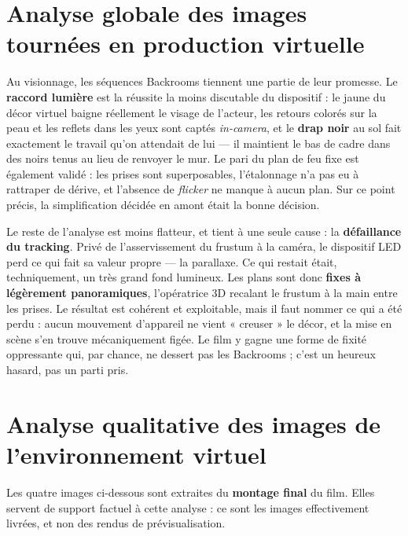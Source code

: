 \documentclass[11pt,a4paper]{report}
\begin{document}
\section{Analyse globale des images tournées en production virtuelle}
Au visionnage, les séquences Backrooms tiennent une partie de leur promesse. Le
\textbf{raccord lumière} est la réussite la moins discutable du dispositif : le jaune du décor
virtuel baigne réellement le visage de l'acteur, les retours colorés sur la peau et les reflets dans
les yeux sont captés \emph{in-camera}, et le \textbf{drap noir} au sol fait exactement le travail
qu'on attendait de lui --- il maintient le bas de cadre dans des noirs tenus au lieu de renvoyer le
mur. Le pari du plan de feu fixe est également validé : les prises sont superposables, l'étalonnage
n'a pas eu à rattraper de dérive, et l'absence de \emph{flicker} ne manque à aucun plan. Sur ce
point précis, la simplification décidée en amont était la bonne décision.

Le reste de l'analyse est moins flatteur, et tient à une seule cause : la \textbf{défaillance du
tracking}. Privé de l'asservissement du frustum à la caméra, le dispositif LED perd ce qui fait
sa valeur propre --- la parallaxe. Ce qui restait était, techniquement, un très grand fond
lumineux. Les plans sont donc \textbf{fixes à légèrement panoramiques}, l'opératrice 3D
recalant le frustum à la main entre les prises. Le résultat est cohérent et exploitable, mais il
faut nommer ce qui a été perdu : aucun mouvement d'appareil ne vient « creuser » le décor, et
la mise en scène s'en trouve mécaniquement figée. Le film y gagne une forme de fixité
oppressante qui, par chance, ne dessert pas les Backrooms ; c'est un heureux hasard, pas un
parti pris.

\section{Analyse qualitative des images de l'environnement virtuel}
Les quatre images ci-dessous sont extraites du \textbf{montage final} du film. Elles servent de
support factuel à cette analyse : ce sont les images effectivement livrées, et non des rendus de
prévisualisation.
\end{document}
